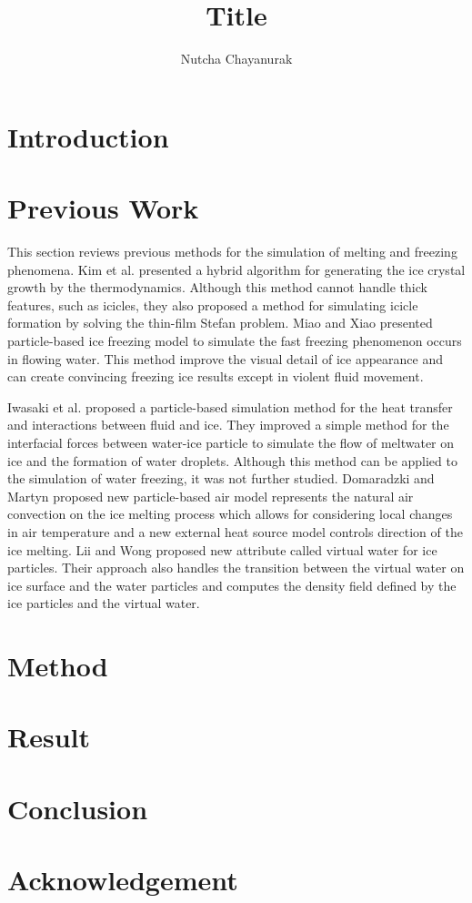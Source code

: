 \documentclass[10pt, twocolumn] {IEEEtran}
\begin{document}
\title{Title}
\author{Nutcha Chayanurak}
\maketitle
\begin{abstract}  \end{abstract}
\section{Introduction}
\section{Previous Work}
 This section reviews previous methods for the simulation of melting and freezing phenomena. Kim et al.\cite{kim2004hybrid} presented a hybrid algorithm for generating the ice crystal growth by the thermodynamics. Although this method cannot handle thick features, such as icicles, they also proposed a method for simulating icicle formation by solving the thin-film Stefan problem\cite{kim2006modeling}. Miao and Xiao\cite{Miao:2015:PIF:2817675.2817676} presented particle-based ice freezing model to simulate the fast freezing phenomenon occurs in flowing water. This method improve the visual detail of ice appearance and can create convincing freezing ice results except in violent fluid movement. 
 
 Iwasaki et al.\cite{iwasaki2010fast} proposed a particle-based simulation method for the heat transfer and interactions between fluid and ice. They improved a simple method for the interfacial forces between water-ice particle to simulate the flow of meltwater on ice and the formation of water droplets. Although this method can be applied to the simulation of water freezing, it was not further studied.
 Domaradzki and Martyn\cite{domaradzki2014improved} proposed new particle-based air model represents the natural air convection on the ice melting process  which allows for considering  local changes in air temperature and a new external heat source model controls direction of the ice melting.
 Lii and Wong\cite{lii2014ice} proposed new attribute called virtual water for ice particles. Their approach also handles the transition between the virtual water on ice surface and the water particles and computes the density field defined by the ice particles and the virtual water.

\section{Method}
\section{Result}
\section{Conclusion}
\section{Acknowledgement}

\nocite{*}


\end{document}
